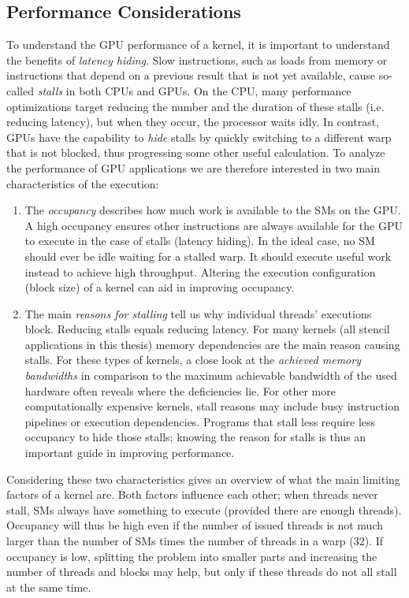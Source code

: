 \subsection{Performance Considerations}
\label{sec:arguing}

To understand the GPU performance of a kernel, it is important to understand the benefits of \emph{latency hiding}. Slow instructions, such as loads from memory or instructions that depend on a previous result that is not yet available, cause so-called \emph{stalls} in both CPUs and GPUs. On the CPU, many performance optimizations target reducing the number and the duration of these stalls (i.e. reducing latency), but when they occur, the processor waits idly. In contrast, GPUs have the capability to \emph{hide} stalls by quickly switching to a different warp that is not blocked, thus progressing some other useful calculation. To analyze the performance of GPU applications we are therefore interested in two main characteristics of the execution:

\begin{enumerate}
    \item The \emph{occupancy} describes how much work is available to the SMs on the GPU. A high occupancy ensures other instructions are always available for the GPU to execute in the case of stalls (latency hiding). In the ideal case, no SM should ever be idle waiting for a stalled warp. It should execute useful work instead to achieve high throughput. Altering the execution configuration (block size) of a kernel can aid in improving occupancy.
    \item The main \emph{reasons for stalling} tell us why individual threads' executions block. Reducing stalls equals reducing latency. For many kernels (all stencil applications in this thesis) memory dependencies are the main reason causing stalls. For these types of kernels, a close look at the \emph{achieved memory bandwidths} in comparison to the maximum achievable bandwidth of the used hardware often reveals where the deficiencies lie. For other more computationally expensive kernels, stall reasons may include busy instruction pipelines or execution dependencies. Programs that stall less require less occupancy to hide those stalls; knowing the reason for stalls is thus an important guide in improving performance.
\end{enumerate}

Considering these two characteristics gives an overview of what the main limiting factors of a kernel are. Both factors influence each other; when threads never stall, SMs always have something to execute (provided there are enough threads). Occupancy will thus be high even if the number of issued threads is not much larger than the number of SMs times the number of threads in a warp (32). If occupancy is low, splitting the problem into smaller parts and increasing the number of threads and blocks may help, but only if these threads do not all stall at the same time.

